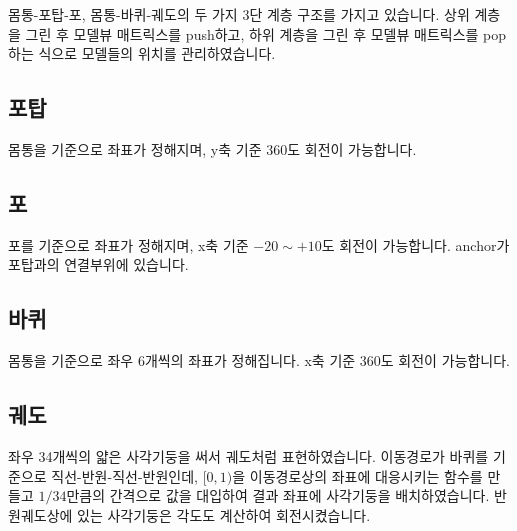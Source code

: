 \documentclass[12pt]{article}
\begin{document}
몸통-포탑-포, 몸통-바퀴-궤도의 두 가지 3단 계층 구조를 가지고 있습니다. 상위
계층을 그린 후 모델뷰 매트릭스를 push하고, 하위 계층을 그린 후 모델뷰 매트릭스를
pop하는 식으로 모델들의 위치를 관리하였습니다.

\subsection{포탑}

몸통을 기준으로 좌표가 정해지며, y축 기준 360도 회전이 가능합니다.

\subsection{포}

포를 기준으로 좌표가 정해지며, x축 기준 $-20\sim+10$도 회전이 가능합니다. anchor가
포탑과의 연결부위에 있습니다.

\subsection{바퀴}

몸통을 기준으로 좌우 6개씩의 좌표가 정해집니다. x축 기준 360도 회전이
가능합니다.

\subsection{궤도}

좌우 34개씩의 얇은 사각기둥을 써서 궤도처럼 표현하였습니다. 이동경로가 바퀴를
기준으로 직선-반원-직선-반원인데, $[0,1)$을 이동경로상의 좌표에 대응시키는
함수를 만들고 $1/34$만큼의 간격으로 값을 대입하여 결과 좌표에 사각기둥을
배치하였습니다. 반원궤도상에 있는 사각기둥은 각도도 계산하여 회전시켰습니다.
\end{document}
